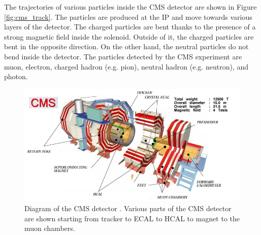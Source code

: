 The trajectories of various particles inside the CMS detector are shown in Figure
\ref{fig:cms_track}. The particles are produced at the IP and
move towards various layers of the detector. The charged particles are bent
thanks to the presence of a strong magnetic field inside the solenoid. Outside of it, 
the charged particles are bent in the opposite direction. On the other hand, the neutral particles 
do not bend inside the detector. The particles detected by the CMS experiment are 
muon, electron, charged hadron (e.g. pion), neutral hadron (e.g. neutron), and photon.
\begin{figure}
  \begin{center}
  \includegraphics[width=0.90\linewidth]{Experiment/CMS/Image/cmsdiag.png}
	  \caption{Diagram of the CMS detector \cite{cmsDiagram}. Various parts 
	  of the CMS detector are shown starting from tracker to ECAL to HCAL to magnet to 
	  the muon chambers.}
  \label{fig:cms_diag}
  \end{center}
\end{figure}
